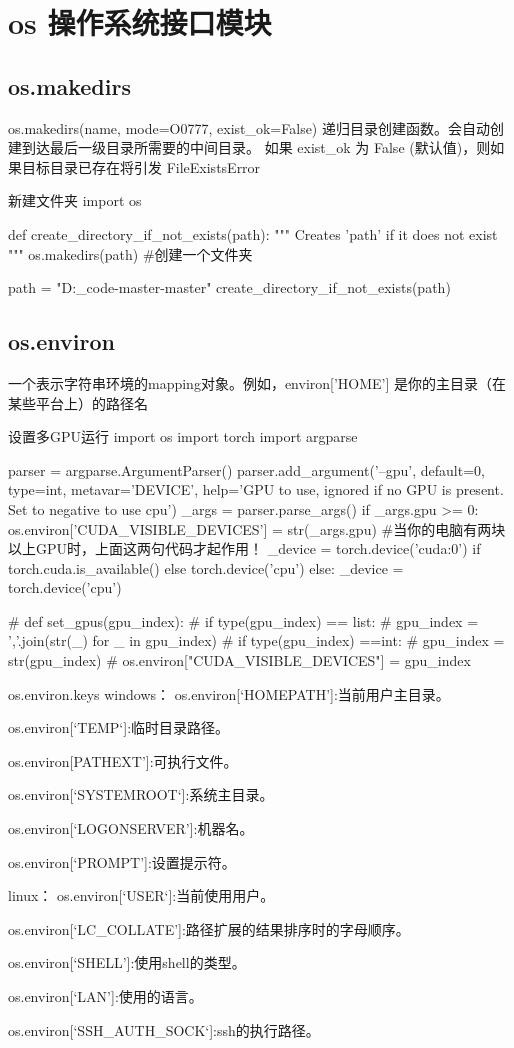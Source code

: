 \documentclass[11pt]{article}
\begin{document}
\section{os 操作系统接口模块}
\subsection{os.makedirs}
os.makedirs(name, mode=O0777, exist\_ok=False)
递归目录创建函数。会自动创建到达最后一级目录所需要的中间目录。
如果 exist\_ok 为 False (默认值)，则如果目标目录已存在将引发 FileExistsError
\begin{Python}{新建文件夹}
import os

def create_directory_if_not_exists(path):
"""
Creates 'path' if it does not exist
"""
os.makedirs(path) #创建一个文件夹

path = "D:\python_code\RPMNet-master\RPMNet-master\problem"
create_directory_if_not_exists(path)
\end{Python}
\subsection{os.environ}
一个表示字符串环境的mapping对象。例如，environ['HOME'] 是你的主目录（在某些平台上）的路径名
\begin{Python}{设置多GPU运行}
import os
import torch
import argparse

parser = argparse.ArgumentParser()
parser.add_argument('--gpu', default=0, type=int, metavar='DEVICE',
help='GPU to use, ignored if no GPU is present. Set to negative to use cpu')
_args = parser.parse_args()
if _args.gpu >= 0:
	os.environ['CUDA_VISIBLE_DEVICES'] = str(_args.gpu)  #当你的电脑有两块以上GPU时，上面这两句代码才起作用！
	_device = torch.device('cuda:0') if torch.cuda.is_available() else torch.device('cpu')
else:
	_device = torch.device('cpu')

# def set_gpus(gpu_index):
#     if type(gpu_index) == list:
#         gpu_index = ','.join(str(_) for _ in gpu_index)
#     if type(gpu_index) ==int:
#         gpu_index = str(gpu_index)
#     os.environ["CUDA_VISIBLE_DEVICES"] = gpu_index
\end{Python}
\begin{Python}{os.environ.keys}
windows：
os.environ[‘HOMEPATH’]:当前用户主目录。

os.environ[‘TEMP‘]:临时目录路径。

os.environ[PATHEXT’]:可执行文件。

os.environ[‘SYSTEMROOT‘]:系统主目录。

os.environ[‘LOGONSERVER’]:机器名。

os.environ[‘PROMPT’]:设置提示符。

linux：
os.environ[‘USER‘]:当前使用用户。

os.environ[‘LC_COLLATE’]:路径扩展的结果排序时的字母顺序。

os.environ[‘SHELL’]:使用shell的类型。

os.environ[‘LAN’]:使用的语言。

os.environ[‘SSH_AUTH_SOCK‘]:ssh的执行路径。
\end{Python}
\end{document}

